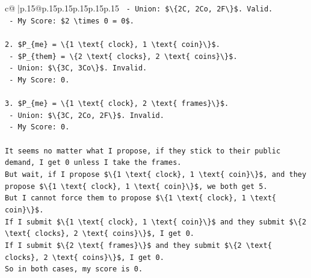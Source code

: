 \documentclass{article}
\begin{document}
{\begin{supertabular}{c@{$\;$}|p{.15\linewidth}@{}p{.15\linewidth}p{.15\linewidth}p{.15\linewidth}p{.15\linewidth}p{.15\linewidth}}
{{{\texttt{   {-} Union: \$\textbackslash{}\{2C, 2Co, 2F\textbackslash{}\}\$. Valid.} \\
\texttt{   {-} My Score: \$2 \textbackslash{}times 0 = 0\$.} \\
\\ 
\texttt{2. \$P\_\{me\} = \textbackslash{}\{1 \textbackslash{}text\{ clock\}, 1 \textbackslash{}text\{ coin\}\textbackslash{}\}\$.} \\
\texttt{   {-} \$P\_\{them\} = \textbackslash{}\{2 \textbackslash{}text\{ clocks\}, 2 \textbackslash{}text\{ coins\}\textbackslash{}\}\$.} \\
\texttt{   {-} Union: \$\textbackslash{}\{3C, 3Co\textbackslash{}\}\$. Invalid.} \\
\texttt{   {-} My Score: 0.} \\
\\ 
\texttt{3. \$P\_\{me\} = \textbackslash{}\{1 \textbackslash{}text\{ clock\}, 2 \textbackslash{}text\{ frames\}\textbackslash{}\}\$.} \\
\texttt{   {-} Union: \$\textbackslash{}\{3C, 2Co, 2F\textbackslash{}\}\$. Invalid.} \\
\texttt{   {-} My Score: 0.} \\
\\ 
\texttt{It seems no matter what I propose, if they stick to their public demand, I get 0 unless I take the frames.} \\
\texttt{But wait, if I propose \$\textbackslash{}\{1 \textbackslash{}text\{ clock\}, 1 \textbackslash{}text\{ coin\}\textbackslash{}\}\$, and they propose \$\textbackslash{}\{1 \textbackslash{}text\{ clock\}, 1 \textbackslash{}text\{ coin\}\textbackslash{}\}\$, we both get 5.} \\
\texttt{But I cannot force them to propose \$\textbackslash{}\{1 \textbackslash{}text\{ clock\}, 1 \textbackslash{}text\{ coin\}\textbackslash{}\}\$.} \\
\texttt{If I submit \$\textbackslash{}\{1 \textbackslash{}text\{ clock\}, 1 \textbackslash{}text\{ coin\}\textbackslash{}\}\$ and they submit \$\textbackslash{}\{2 \textbackslash{}text\{ clocks\}, 2 \textbackslash{}text\{ coins\}\textbackslash{}\}\$, I get 0.} \\
\texttt{If I submit \$\textbackslash{}\{2 \textbackslash{}text\{ frames\}\textbackslash{}\}\$ and they submit \$\textbackslash{}\{2 \textbackslash{}text\{ clocks\}, 2 \textbackslash{}text\{ coins\}\textbackslash{}\}\$, I get 0.} \\
\texttt{So in both cases, my score is 0.} \\
}}}
\end{supertabular}}
\end{document}
